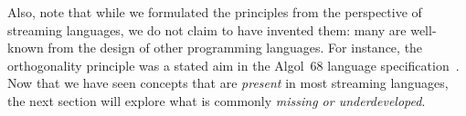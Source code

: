 Also, note that while
we formulated the principles from the perspective of streaming
languages, we do not claim to have invented them: many are well-known
from the design of other programming languages. For instance, the
orthogonality principle was a stated aim in the Algol~68 language
specification~\cite{vanwijngaarden_et_al_1975}. Now that we have seen
concepts that are \emph{present} in most streaming languages, the next
section will explore what is commonly \emph{missing or
  underdeveloped}.
